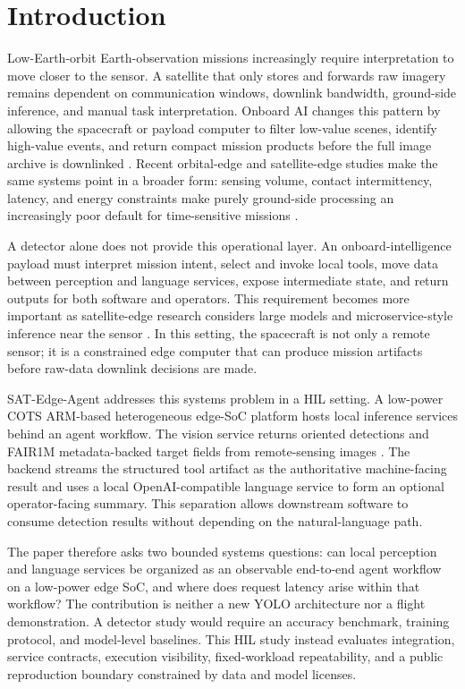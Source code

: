 \documentclass[10pt,letterpaper]{article}
\begin{document}
\section{Introduction}

Low-Earth-orbit Earth-observation missions increasingly require interpretation to move closer to the sensor. A satellite that only stores and forwards raw imagery remains dependent on communication windows, downlink bandwidth, ground-side inference, and manual task interpretation. Onboard AI changes this pattern by allowing the spacecraft or payload computer to filter low-value scenes, identify high-value events, and return compact mission products before the full image archive is downlinked \cite{phisat1,cloudscout,ravaen}. Recent orbital-edge and satellite-edge studies make the same systems point in a broader form: sensing volume, contact intermittency, latency, and energy constraints make purely ground-side processing an increasingly poor default for time-sensitive missions \cite{oec_asplos,satedge_tcom,ai_onboard_survey}.

A detector alone does not provide this operational layer. An onboard-intelligence payload must interpret mission intent, select and invoke local tools, move data between perception and language services, expose intermediate state, and return outputs for both software and operators. This requirement becomes more important as satellite-edge research considers large models and microservice-style inference near the sensor \cite{satellite_edge_large_models}. In this setting, the spacecraft is not only a remote sensor; it is a constrained edge computer that can produce mission artifacts before raw-data downlink decisions are made.

SAT-Edge-Agent addresses this systems problem in a HIL setting. A low-power COTS ARM-based heterogeneous edge-SoC platform hosts local inference services behind an agent workflow. The vision service returns oriented detections and FAIR1M metadata-backed target fields from remote-sensing images \cite{fair1m}. The backend streams the structured tool artifact as the authoritative machine-facing result and uses a local OpenAI-compatible language service to form an optional operator-facing summary. This separation allows downstream software to consume detection results without depending on the natural-language path.

The paper therefore asks two bounded systems questions: can local perception and language services be organized as an observable end-to-end agent workflow on a low-power edge SoC, and where does request latency arise within that workflow? The contribution is neither a new YOLO architecture nor a flight demonstration. A detector study would require an accuracy benchmark, training protocol, and model-level baselines. This HIL study instead evaluates integration, service contracts, execution visibility, fixed-workload repeatability, and a public reproduction boundary constrained by data and model licenses.
\end{document}
